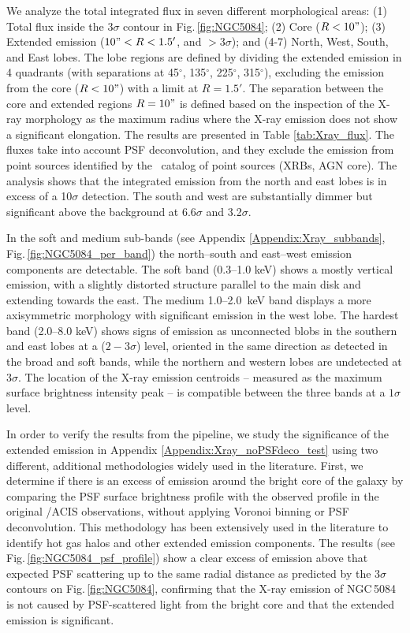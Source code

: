 \documentclass[modern]{aastex631}
\begin{document}
We analyze the total integrated flux in seven different morphological areas: (1) Total %
flux inside the $3\sigma$ contour in Fig.\,\ref{fig:NGC5084}; (2) Core ($R<10"$); (3) Extended emission ($10"<R<1.5'$, and $>3\sigma$); and (4-7) North, West, South, and East lobes. The lobe regions are defined by dividing the extended emission in 4 quadrants (with separations at 45$^{\circ}$, 135$^{\circ}$, 225$^{\circ}$, 315$^{\circ}$), excluding the emission from the core ($R<10"$) with a limit at $R=1.5'$. The separation between the core and extended regions $R=10"$ is defined based on the inspection of the X-ray morphology as the maximum radius where the X-ray emission does not show a significant elongation. The results are presented in Table \ref{tab:Xray_flux}. The fluxes take into account PSF deconvolution, and they exclude the emission from point sources identified by the \Chandra\ catalog of point sources (XRBs, AGN core). The analysis shows that the integrated emission from the north and east lobes is in excess of a 10$\sigma$ detection. The south and west are substantially dimmer but significant above the background at 6.6$\sigma$ and 3.2$\sigma$. 

In the soft and medium sub-bands (see Appendix \ref{Appendix:Xray_subbands}, Fig.\,\ref{fig:NGC5084_per_band}) the north--south and east--west emission components are detectable. The soft band (0.3--1.0 keV) shows a mostly vertical emission, with a slightly distorted structure parallel to the main disk and extending towards the east. The medium 1.0--2.0~keV band displays a more axisymmetric morphology with significant emission in the west lobe. The hardest band (2.0--8.0 keV) shows signs of emission as unconnected blobs in the southern and east lobes at a ($2-3\sigma$) level, oriented in the same direction as detected in the broad and soft bands, while the northern and western lobes are undetected at $3\sigma$. The location of the X-ray emission centroids -- measured as the maximum surface brightness intensity peak -- is compatible between the three bands at a $1\sigma$ level.


In order to verify the results from the pipeline, we study the significance of the extended emission in Appendix \ref{Appendix:Xray_noPSFdeco_test} using two different, additional methodologies widely used in the literature. First, we determine if there is an excess of emission around the bright core of the galaxy by comparing the PSF surface brightness profile with the observed profile in the original \Chandra/ACIS observations, without applying Voronoi binning or PSF deconvolution. This methodology has been extensively used in the literature \citep{fabbiano+2017apj842_4,fabbiano+2018apj855_131, jones+2020apj891_133,ma+2020apj900_164,ma+2023apj948_61} to identify hot gas halos and other extended emission components. The results (see Fig.\,\ref{fig:NGC5084_psf_profile}) show a clear excess of emission above that expected PSF scattering up to the same radial distance as predicted by the $3\sigma$ contours on Fig.\,\ref{fig:NGC5084}, confirming that the X-ray emission of NGC\,5084 is not caused by PSF-scattered light from the bright core and that the extended emission is significant.
\end{document}
